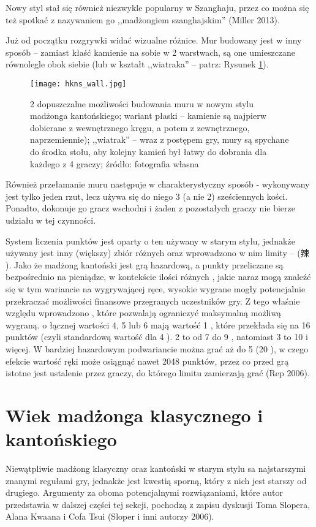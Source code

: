 Nowy styl stał się również niezwykle popularny w Szanghaju, przez co można się
też spotkać z nazywaniem go ,,madżongiem szanghajskim'' (Miller 2013).

Już od początku rozgrywki widać wizualne różnice. Mur budowany jest w inny
sposób -- zamiast kłaść kamienie na sobie w 2 warstwach, są one umieszczane
równolegle obok siebie (lub w kształt ,,wiatraka'' -- patrz: Rysunek
\ref{fig:hkns_wall}).

\begin{figure}[H]
  \centering
  \texttt{[image: hkns\_wall.jpg]}
  \caption{2 dopuszczalne możliwości budowania muru w nowym stylu madżonga
  kantońskiego; wariant płaski -- kamienie są najpierw
dobierane z wewnętrznego kręgu, a potem z zewnętrznego, naprzemiennie);
,,wiatrak'' -- wraz z postępem gry, mury są spychane do środka stołu, aby
kolejny kamień był łatwy do dobrania dla każdego z 4 graczy; źródło:
  fotografia własna}
  \label{fig:hkns_wall}
\end{figure}

Również przełamanie muru następuje w charakterystyczny sposób - wykonywany jest
tylko jeden rzut, lecz używa się do niego 3 (a nie 2) sześciennych kości.
Ponadto, dokonuje go gracz wschodni i żaden z pozostałych graczy nie bierze
udziału w tej czynności.

System liczenia punktów jest oparty o ten używany w starym stylu, jednakże
używany jest inny (większy) zbiór różnych  oraz wprowadzono w nim
limity --  (辣 ). Jako że madżong kantoński jest
grą hazardową, a punkty przeliczane są bezpośrednio na pieniądze, w kontekście
ilości różnych , jakie naraz mogą znaleźć się w tym wariancie na
wygrywającej ręce, wysokie wygrane mogły potencjalnie przekraczać możliwości finansowe
przegranych uczestników gry. Z tego właśnie względu wprowadzono ,
które pozwalają ograniczyć maksymalną możliwą wygraną.  o łącznej
wartości 4, 5 lub 6 mają wartość 1 , które przekłada się na 16 punktów
(czyli standardową wartość dla 4 ). 2  to od 7 do 9
, natomiast 3  to 10 i więcej. W bardziej hazardowym
podwariancie można grać aż do 5  (20 ), w czego
efekcie wartość ręki może osiągnąć nawet 2048 punktów, przez co przed grą
istotne jest ustalenie przez graczy, do którego limitu zamierzają grać (Rep 2006).

\section{Wiek madżonga klasycznego i kantońskiego}
\label{ccvshkos}
Niewątpliwie madżong klasyczny oraz kantoński w starym stylu sa najstarszymi
znanymi regułami gry, jednakże jest kwestią sporną, który z nich jest starszy
od drugiego. Argumenty za oboma potencjalnymi rozwiązaniami, które autor
przedstawia w dalszej części tej sekcji, pochodzą z zapisu dyskusji Toma
Slopera, Alana Kwaana i Cofa Tsui (Sloper i inni autorzy 2006).

